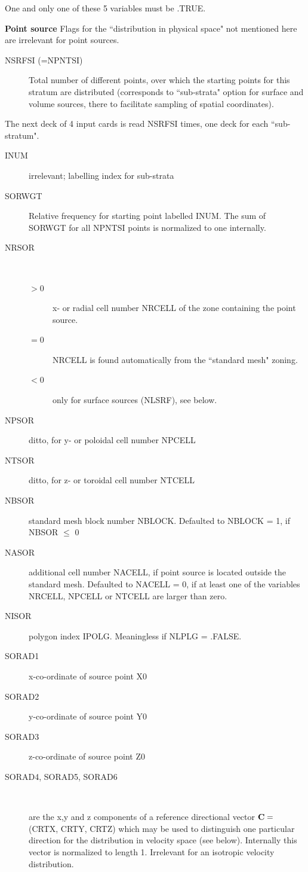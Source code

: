 One and only one of these 5 variables must be .TRUE.

\medskip

\textcolor[rgb]{0.00,0.00,1.00}{\textbf{Point source}}
Flags for the ``distribution in physical space" not mentioned here are
irrelevant for point sources.
\begin{description}
  \item[NSRFSI (=NPNTSI)] Total number of different points, over which the
        starting points for this stratum are distributed (corresponds to ``sub-strata"
        option for surface and volume sources, there to facilitate sampling of spatial
        coordinates).
\end{description}
The next deck of 4 input cards is read NSRFSI times, one deck for each
``sub-stratum".
\begin{description}
  \item[INUM] irrelevant; labelling index for sub-strata
  \item[SORWGT] Relative
        frequency for starting point labelled INUM.
        The sum of SORWGT for all NPNTSI points is normalized to one internally.
  \item[NRSOR] ~ 

        \begin{description}
          \item[$> 0$] x- or radial cell number NRCELL of the zone
                containing the point source.
          \item[$= 0$] NRCELL is found automatically from the ``standard mesh" zoning.
          \item[$< 0$] only for surface sources (NLSRF), see below.
        \end{description}
  \item[NPSOR] ditto, for y- or poloidal cell number NPCELL
  \item[NTSOR] ditto,
        for z- or toroidal cell number NTCELL
  \item[NBSOR] standard mesh block number
        NBLOCK.
        Defaulted to NBLOCK = 1, if NBSOR $\le$ 0
  \item[NASOR] additional cell number
        NACELL, if point source is located outside the standard mesh.
        Defaulted to NACELL = 0, if at least one of the variables NRCELL, NPCELL or
        NTCELL are larger than zero.
  \item[NISOR] polygon index IPOLG.
        Meaningless if NLPLG = .FALSE.
  \item[SORAD1] x-co-ordinate of source point X0
  \item[SORAD2] y-co-ordinate of
        source point Y0
  \item[SORAD3] z-co-ordinate of source point Z0
  \item[SORAD4,
        SORAD5, SORAD6] ~ 

        are the x,y and z components of a reference directional vector $\mathbf{C} =$ (CRTX,
        CRTY, CRTZ) which may be used to distinguish one particular direction for the
        distribution in velocity space (see below).
        Internally this vector is normalized to length 1.
        Irrelevant for an isotropic velocity distribution.
\end{description}

